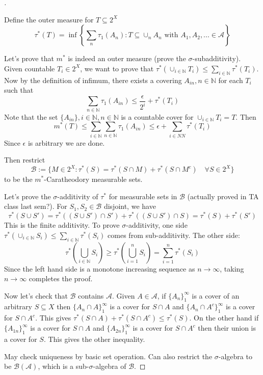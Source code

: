 \documentclass{article}
\theoremstyle{definition}
\newenvironment{proofs}[1][\proofname]{%
  \begin{proof}[#1]$ $\par\nobreak\ignorespaces
}{%
  \end{proof}
}
\newcommand{\NN}{\mathbb N}
\begin{document}
\begin{proofs}
	\par Define the outer measure for $T \subseteq 2^X$
	\[
		\tau^*(T) = \inf \left\{ \sum_n \tau_1(A_n): T \subseteq \cup_n A_n \text{ with } A_1, A_2, ... \in \mathscr{A} \right\}
	\]

	\par Let's prove that $m^*$ is indeed an outer measure (prove the $\sigma$-subadditivity).
	Given countable $T_i \in 2^X$, we want to prove that $\tau^*(\cup_{i \in \NN} T_i) \leq \sum_{i \in \NN} \tau^*(T_i)$.
	Now by the definition of infimum, there exists a covering $A_{in}, n \in \NN$ for each $T_i$ such that 
	\[
		\sum_{n \in \NN} \tau_1(A_{in}) \leq \frac{\epsilon}{2^i} + \tau^*(T_i)
	\]
	Note that the set $\{A_{in}\}, i \in \NN, n \in \NN$ is a countable cover for $\cup_{i \in \NN} T_i = T$.
	Then
	\[
		m^*(T) \leq \sum_{i \in \NN} \sum_{n \in \NN} \tau_1(A_{in}) \leq \epsilon + \sum_{i \in NN} \tau^*(T_i)
	\]
	Since $\epsilon$ is arbitrary we are done.

	Then restrict 
	\[
		\mathscr{B} := \{ M \in 2^X: \tau^*(S) = \tau^*(S \cap M) + \tau^*(S \cap M^c) \quad \forall S \in 2^X\}
	\]
	to be the $m^*$-Caratheodory measurable sets.
	
	\par Let's prove the $\sigma$-additivity of $\tau^*$ for measurable sets in $\mathscr{B}$ (actually proved in TA class last sem?).
	For $S_1, S_2 \in \mathscr{B}$ disjoint, we have
	\[
		\tau^*(S \cup S') = \tau^*((S \cup S') \cap S') + \tau^*((S \cup S') \cap S) = \tau^*(S) + \tau^*(S')
	\]
	This is the finite additivity. 
	To prove $\sigma$-additivity, one side $\tau^*(\cup_{i \in \NN} S_i) \leq \sum_{i \in \NN} \tau^*(S_i)$ comes from sub-additivity.
	The other side:
	\[
		\tau^*(\bigcup_{i \in \NN} S_i) \geq \tau^*(\bigcup_{i = 1}^n S_i) = \sum_{i = 1}^n \tau^*(S_i)
	\]
	Since the left hand side is a monotone increasing sequence as $n \to \infty$, taking $n \to \infty$ completes the proof.

	\par Now let's check that $\mathscr{B}$ contains $\mathscr{A}$.
	Given $A \in \mathscr{A}$, if $\{A_n\}_1^\infty$ is a cover of an arbitrary $S \subseteq X$ then $\{A_n \cap A\}_1^\infty$ is a cover for $S \cap A$ and $\{A_n \cap A^c\}_1^\infty$ is a cover for $S \cap A^c$.
	This gives $\tau^*(S \cap A) + \tau^*(S \cap A^c) \leq \tau^*(S)$.
	On the other hand if $\{A_{1n}\}_1^\infty$ is a cover for $S \cap A$ and $\{A_{2n}\}_1^\infty$ is a cover for $S \cap A^c$ then their union is a cover for $S$.
	This gives the other inequality.
	
	\par May check uniqueness by basic set operation.
	Can also restrict the $\sigma$-algebra to be $\mathscr{B}(\mathscr{A})$, which is a sub-$\sigma$-algebra of $\mathscr{B}$.
\end{proofs}
\end{document}
